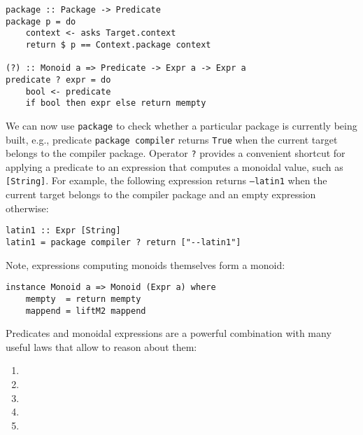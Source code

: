 \begin{lstlisting}[basicstyle=\ttfamily]
package :: Package -> Predicate
package p = do
    context <- asks Target.context
    return $ p == Context.package context

(?) :: Monoid a => Predicate -> Expr a -> Expr a
predicate ? expr = do
    bool <- predicate
    if bool then expr else return mempty
\end{lstlisting}

We can now use \texttt{package} to check whether a particular package is
currently being built, e.g., predicate \texttt{package compiler} returns
\texttt{True} when the current target belongs to the compiler package.
Operator \texttt{?} provides a convenient shortcut for applying a predicate
to an expression that computes a monoidal value, such as \texttt{[String]}. For
example, the following expression returns \texttt{--latin1} when the current
target belongs to the compiler package and an empty expression otherwise:

\begin{lstlisting}[basicstyle=\ttfamily]
latin1 :: Expr [String]
latin1 = package compiler ? return ["--latin1"]
\end{lstlisting}

\noindent Note, expressions computing monoids themselves form a monoid:

\begin{lstlisting}[basicstyle=\ttfamily]
instance Monoid a => Monoid (Expr a) where
    mempty  = return mempty
    mappend = liftM2 mappend
\end{lstlisting}

Predicates and monoidal expressions are a powerful combination with many useful
laws that allow to reason about them:
\begin{enumerate}
  \item {} 
  \item {} 
  \item {} 
  \item {} 
  \item {} 
\end{enumerate}


